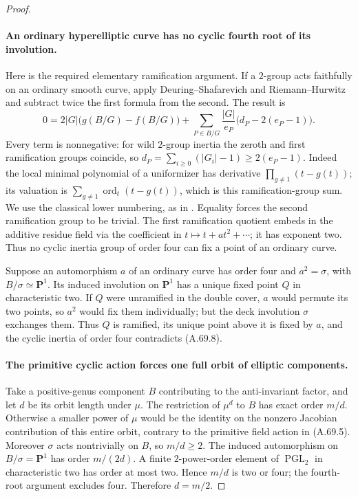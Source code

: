 \begin{proof}
\paragraph{An ordinary hyperelliptic curve has no cyclic fourth root of its involution.}
Here is the required elementary ramification argument. If a
\(2\)-group acts faithfully on an ordinary smooth curve, apply
Deuring--Shafarevich and Riemann--Hurwitz and subtract twice the
first formula from the second. The result is
\[
 0=2|G|\bigl(g(B/G)-f(B/G)\bigr)
       +\sum_{P\in B/G}\frac{|G|}{e_P}
                          \bigl(d_P-2(e_P-1)\bigr).
                                                        \tag{A.69.8}
\]
Every term is nonnegative: for wild \(2\)-group inertia the
zeroth and first ramification groups coincide, so
\(d_P=\sum_{i\ge0}(|G_i|-1)\ge2(e_P-1)\).
Indeed the local minimal polynomial of a uniformizer has derivative
\(\prod_{g\ne1}(t-g(t))\); its valuation is
\(\sum_{g\ne1}\operatorname{ord}_t(t-g(t))\), which is this
ramification-group sum. We use the classical lower numbering,
as in \cite[\S2.2, equation (3) and Exercise 2.12(c)]{fghBouwWewers}.
Equality forces the second ramification
group to be trivial. The first ramification quotient embeds in
the additive residue field via the coefficient in
\(t\mapsto t+a t^2+\cdots\); it has exponent two. Thus no
cyclic inertia group of order four can fix a point of an ordinary
curve.

Suppose an automorphism \(a\) of an ordinary curve has order four
and \(a^2=\sigma\), with \(B/\sigma\simeq\mathbf P^1\).
Its induced involution on \(\mathbf P^1\) has a unique fixed
point \(Q\) in characteristic two. If \(Q\) were unramified in
the double cover, \(a\) would permute its two points, so \(a^2\)
would fix them individually; but the deck involution \(\sigma\)
exchanges them. Thus \(Q\) is ramified, its unique point above it
is fixed by \(a\), and the cyclic inertia of order four
contradicts (A.69.8).

\paragraph{The primitive cyclic action forces one full orbit of elliptic components.}
Take a positive-genus component \(B\) contributing to the
anti-invariant factor, and let \(d\) be its orbit length under
\(\mu\). The restriction of \(\mu^d\) to \(B\) has exact order
\(m/d\). Otherwise a smaller power of \(\mu\) would be the
identity on the nonzero Jacobian contribution of this entire
orbit, contrary to the primitive field action in (A.69.5).
Moreover \(\sigma\) acts nontrivially on \(B\), so \(m/d\ge2\).
The induced automorphism on \(B/\sigma=\mathbf P^1\) has order
\(m/(2d)\). A finite \(2\)-power-order element of
\(\operatorname{PGL}_2\) in characteristic two has order at most
two. Hence \(m/d\) is two or four; the fourth-root argument
excludes four. Therefore \(d=m/2\).


\end{proof}
